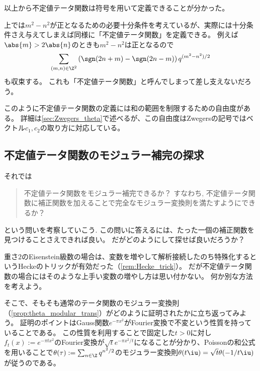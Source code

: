 \documentclass[11pt,b5paper,oneside,lualatex]{ltjsarticle} %
\numberwithin{equation}{section} %
\begin{document}
以上から不定値テータ関数は符号を用いて定義できることが分かった。

\begin{rem} \label{rem:indef_ambiguity}
	上では$ m^2 - n^2 $が正となるための必要十分条件を考えているが、実際には十分条件さえ与えてしまえば同様に「不定値テータ関数」を定義できる。
	例えば$ \abs{m} > 2\abs{n} $のときも$ m^2 - n^2 $は正となるので
	\[
	\sum_{(m, n) \in \Z^2} \left( \sgn(2n+m) - \sgn(2n-m) \right) q^{(m^2 - n^2)/2}
	\]
	も収束する。
	これも「不定値テータ関数」と呼んでしまって差し支えないだろう。
	
	このように不定値テータ関数の定義には和の範囲を制限するための自由度がある。
	詳細は\cref{sec:Zwegers_theta}で述べるが、この自由度はZwegersの記号ではベクトル$ c_1, c_2 $の取り方に対応している。
\end{rem}



\subsection{不定値テータ関数のモジュラー補完の探求} \label{subsec:}


それでは
\begin{quote}
	\centering
	不定値テータ関数をモジュラー補完できるか？
	すなわち, 不定値テータ関数に補正関数を加えることで完全なモジュラー変換則を満たすようにできるか？
\end{quote}
という問いを考察していこう. 
この問いに答えるには、たった一個の補正関数を見つけることさえできれば良い。
だがどのようにして探せば良いだろうか？

重さ$ 2 $のEisenstein級数の場合は、変数を増やして解析接続したのち特殊化するというHeckeのトリックが有効だった（\cref{rem:Hecke_trick}）。
だが不定値テータ関数の場合にはそのような上手い変数の増やし方は思い付かない。
何か別な方法を考えよう。

そこで、そもそも通常のテータ関数のモジュラー変換則（\cref{prop:theta_modular_trans}）がどのように証明されたかに立ち返ってみよう。
証明のポイントはGauss関数$ e^{-\pi x^2} $がFourier変換で不変という性質を持っていることである。
この性質を利用することで固定した$ t > 0 $に対し$ f_t (x) := e^{-\pi t x^2} $のFourier変換が$ \sqrt{t} e^{-\pi  x^2/t} $になることが分かり、Poissonの和公式を用いることで$ \theta (\tau) := \sum_{n \in \Z} q^{n^2/2} $のモジュラー変換則$ \theta (t\iu) = \sqrt{t} \theta (-1/t\iu) $が従うのである。
\end{document}

